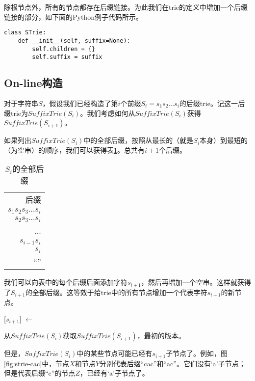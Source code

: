 \documentclass[UTF8]{article}
\begin{document}
除根节点外，所有的节点都存在后缀链接。为此我们在trie的定义中增加一个后缀链接的部分，如下面的Python例子代码所示。

\lstset{language=Python}
\begin{lstlisting}
class STrie:
    def __init__(self, suffix=None):
        self.children = {}
        self.suffix = suffix
\end{lstlisting}

\subsection{On-line构造}

对于字符串$S$，假设我们已经构造了第$i$个前缀$S_i=s_1s_2...s_i$的后缀trie。记这一后缀trie为$SuffixTrie(S_i)$。我们考虑如何从$SuffixTrie(S_i)$获得$SuffixTrie(S_{i+1})$。

如果列出$SuffixTrie(S_i)$中的全部后缀，按照从最长的（就是$S_i$本身）到最短的（为空串）的顺序，我们可以获得表\ref{tab:suffixes_s_i}。总共有$i+1$个后缀。

\begin{table}
  \begin{tabular}{r}
    后缀 \\
    $s_1s_2s_3...s_i$ \\
    $s_2s_3...s_i$ \\
    ... \\
    $s_{i-1}s_i$ \\
    $s_i$ \\
    “” \\
  \end{tabular}
  \caption{$S_i$的全部后缀}
  \label{tab:suffixes_s_i}
\end{table}

我们可以向表中的每个后缀后面添加字符$s_{i+1}$，然后再增加一个空串。这样就获得了$S_{i+1}$的全部后缀。这等效于给trie中的所有节点增加一个代表字符$s_{i+1}$的新节点。

\begin{algorithm}
\begin{algorithmic}[1]
  \State {}[$s_{i+1}$] $\gets$ 
\EndFor
\end{algorithmic}
\caption{从$SuffixTrie(S_i)$获取$SuffixTrie(S_{i+1})$，最初的版本。}
\label{algo:strie1}
\end{algorithm}

但是，$SuffixTrie(S_i)$中的某些节点可能已经有$s_{i+1}$子节点了。例如，图\ref{fig:strie-cac}中，节点$X$和节点$Y$分别代表后缀“cac”和“ac”。它们没有‘a’子节点；但是代表后缀“c”的节点$Z$，已经有‘a’子节点了。
\end{document}
